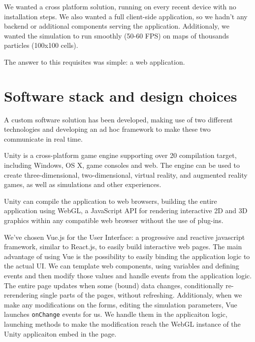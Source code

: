 We wanted a cross platform solution, running on every recent device with no installation steps.
We also wanted a full client-side application, so we hadn't any backend or additional components serving the application. Additionaly, we wanted the simulation to run smoothly (50-60 FPS) on maps of thousands particles (100x100 cells).

The answer to this requisites was simple: a web application.

\section{Software stack and design choices}

A custom software solution has been developed, making use of two different technologies and developing an ad hoc framework to make these two communicate in real time.

Unity is a cross-platform game engine supporting over 20 compilation target, including Windows, OS X, game consoles and web. The engine can be used to create three-dimensional, two-dimensional, virtual reality, and augmented reality games, as well as simulations and other experiences.

Unity can compile the application to web browsers, building the entire application using WebGL, a JavaScript API for rendering interactive 2D and 3D graphics within any compatible web browser without the use of plug-ins.

We've chosen Vue.js for the User Interface: a progressive and reactive javascript framework, similar to React.js, to easily build interactive web pages. The main advantage of using Vue is the possibility to easily binding the application logic to the actual UI. We can template web components, using variables and defining events and then modify those values and handle events from the application logic. The entire page updates when some (bound) data changes, conditionally re-rerendering single parts of the pages, without refreshing. Additionaly, when we make any modifications on the forms, editing the simulation parameters, Vue launches \texttt{onChange} events for us. We handle them in the applicaiton logic, launching methods to make the modification reach the WebGL instance of the Unity applicaiton embed in the page.

